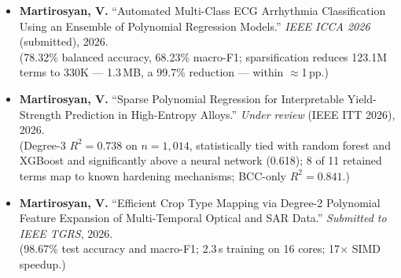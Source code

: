 \documentclass[a4paper,12pt]{article}
\begin{document}
\begin{itemize}[leftmargin=*, itemsep=4pt, topsep=3pt]
        Regression with an Analytical Solver.'' \textit{Applied Computational Intelligence and
        Soft Computing} (major revision), 2026.\\
        {\small(82.75\% $\pm$ 1.03\% six-class accuracy, macro-F1 0.758; 12\,\textmu s inference;
        outperforms CNN, random forest, XGBoost and SVM baselines.)}
  \item \textbf{Martirosyan, V.} ``Automated Multi-Class ECG Arrhythmia Classification Using an
        Ensemble of Polynomial Regression Models.'' \textit{IEEE ICCA 2026} (submitted), 2026.\\
        {\small(78.32\% balanced accuracy, 68.23\% macro-F1; sparsification reduces 123.1M terms to
        330K --- 1.3\,MB, a 99.7\% reduction --- within $\approx$1\,pp.)}
  \item \textbf{Martirosyan, V.} ``Sparse Polynomial Regression for Interpretable Yield-Strength
        Prediction in High-Entropy Alloys.'' \textit{Under review} (IEEE ITT 2026), 2026.\\
        {\small(Degree-3 $R^2 = 0.738$ on $n=1{,}014$, statistically tied with random forest and
        XGBoost and significantly above a neural network (0.618); 8 of 11 retained terms map to
        known hardening mechanisms; BCC-only $R^2 = 0.841$.)}
  \item \textbf{Martirosyan, V.} ``Efficient Crop Type Mapping via Degree-2 Polynomial Feature
        Expansion of Multi-Temporal Optical and SAR Data.'' \textit{Submitted to IEEE TGRS}, 2026.\\
        {\small(98.67\% test accuracy and macro-F1; 2.3\,s training on 16 cores; 17$\times$ SIMD
        speedup.)}
\end{itemize}
\end{document}
